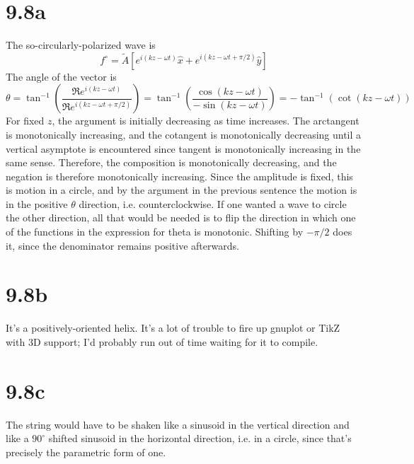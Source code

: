 \documentclass{article}
\begin{document}
\section*{9.8a}
The so-circularly-polarized wave is
\[f^\circ=\tilde{A}\left[ e^{i(kz-\omega t)}\hat{x}+e^{i(kz-\omega t+\pi/2)}\hat{y}\right]\]
The angle of the vector is
\[\theta=\tan^{-1}\left( \frac{\Re e^{i(kz-\omega t)}}{\Re e^{i(kz-\omega t+\pi/2)}} \right)=\tan^{-1}\left( \frac{\cos(kz-\omega t)}{-\sin(kz-\omega t)} \right)=-\tan^{-1}(\cot(kz-\omega t))\]
For fixed $z$, the argument is initially decreasing as time increases. The arctangent is monotonically increasing, and the cotangent is monotonically decreasing until a vertical asymptote is encountered since tangent is monotonically increasing in the same sense. Therefore, the composition is monotonically decreasing, and the negation is therefore monotonically increasing. Since the amplitude is fixed, this is motion in a circle, and by the argument in the previous sentence the motion is in the positive $\theta$ direction, i.e. counterclockwise.
If one wanted a wave to circle the other direction, all that would be needed is to flip the direction in which one of the functions in the expression for theta is monotonic. Shifting by $-\pi/2$ does it, since the denominator remains positive afterwards.

\section*{9.8b}
It's a positively-oriented helix. It's a lot of trouble to fire up gnuplot or TikZ with 3D support; I'd probably run out of time waiting for it to compile.

\section*{9.8c}
The string would have to be shaken like a sinusoid in the vertical direction and like a $90^\circ$ shifted sinusoid in the horizontal direction, i.e. in a circle, since that's precisely the parametric form of one.
\end{document}
